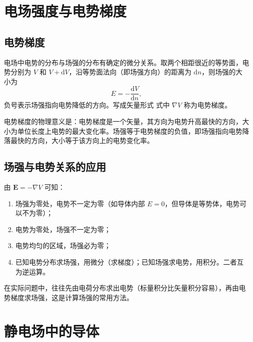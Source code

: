 
\section{电场强度与电势梯度}
    \subsection{电势梯度}
    电场中电势的分布与场强的分布有确定的微分关系。取两个相距很近的等势面，电势分别为 $V$ 和 $V+\mathrm{d}V$，沿等势面法向（即场强方向）的距离为 $\mathrm{d}n$，则场强的大小为
    \[
    E=-\frac{\mathrm{d}V}{\mathrm{d}n},
    \]
    负号表示场强指向电势降低的方向。写成矢量形式
    式中 $\nabla V$ 称为电势梯度。

    电势梯度的物理意义是：电势梯度是一个矢量，其方向为电势升高最快的方向，大小为单位长度上电势的最大变化率。场强等于电势梯度的负值，即场强指向电势降落最快的方向，大小等于该方向上的电势变化率。

    \subsection{场强与电势关系的应用}
    由 $\boldsymbol{E}=-\nabla V$ 可知：
    \begin{enumerate}
        \item 场强为零处，电势不一定为零（如导体内部 $E=0$，但导体是等势体，电势可以不为零）；
        \item 电势为零处，场强不一定为零；
        \item 电势均匀的区域，场强必为零；
        \item 已知电势分布求场强，用微分（求梯度）；已知场强求电势，用积分。二者互为逆运算。
    \end{enumerate}
    在实际问题中，往往先由电荷分布求出电势（标量积分比矢量积分容易），再由电势梯度求场强，这是计算场强的常用方法。


\section{静电场中的导体}
